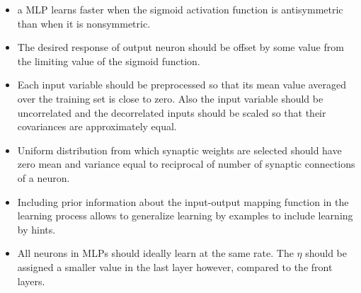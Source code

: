 \documentclass[12pt]{article}
\begin{document}
\begin{itemize}
\item a MLP learns faster when the sigmoid activation function is antisymmetric than when it is nonsymmetric.
\item The desired response of output neuron should be offset by some value from the limiting value of the sigmoid function.
\item Each input variable should be preprocessed so that its mean value averaged over the training set is close to zero. Also the input variable should be uncorrelated and the decorrelated inputs should be scaled so that their covariances are approximately equal.
\item Uniform distribution from which synaptic weights are selected should have zero mean and variance equal to reciprocal of number of synaptic connections of a neuron.
\item Including prior information about the input-output mapping function in the learning process allows to generalize learning by examples to include learning by hints.
\item All neurons in MLPs should ideally learn at the same rate. The $\eta$ should be assigned a smaller value in the last layer however, compared to the front layers.
\end{itemize}
\end{document}
